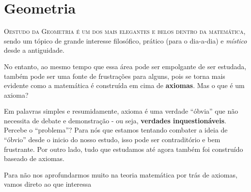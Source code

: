 \chapter{Geometria}
\label{geometria}

\lettrine{O}{estudo da Geometria é um dos mais elegantes e belos dentro da matemática}, sendo um tópico de grande interesse filosófico, prático (para o dia-a-dia) e \textit{místico} desde a antiguidade.

No entanto, ao mesmo tempo que essa área pode ser empolgante de ser estudada, também pode ser uma fonte de frustrações para alguns, pois se torna mais evidente como a matemática é construída em cima de \textbf{axiomas}. Mas o que é um axioma?

Em palavras simples e resumidamente, axioma é uma verdade ``óbvia'' que não necessita de debate e demonstração - ou seja, \textbf{verdades inquestionáveis}. Percebe o ``problema''? Para nós que estamos tentando combater a ideia de ``óbvio'' desde o inicio do nosso estudo, isso pode ser contraditório e bem frustrante. Por outro lado, tudo que estudamos até agora também foi construído baseado de axiomas.

Para não nos aprofundarmos muito na teoria matemática por trás de axiomas, vamos direto ao que interessa